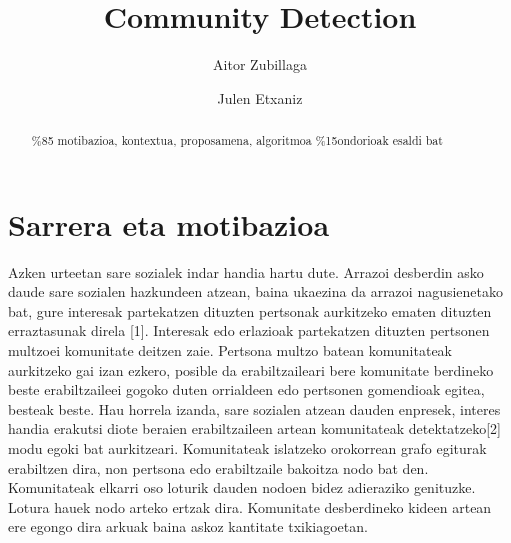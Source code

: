 \documentclass[sigconf]{acmart}
\begin{document}
\title{Community Detection}

\author{Aitor Zubillaga}

\author{Julen Etxaniz}



\begin{abstract}
\%85 motibazioa, kontextua, proposamena, algoritmoa
\%15ondorioak esaldi bat

\end{abstract}


\maketitle

\section{Sarrera eta motibazioa}

Azken urteetan sare sozialek indar handia hartu dute. Arrazoi desberdin asko daude sare sozialen hazkundeen atzean, baina ukaezina da arrazoi nagusienetako bat, gure interesak partekatzen dituzten pertsonak aurkitzeko ematen dituzten erraztasunak direla [1]. Interesak edo erlazioak partekatzen dituzten pertsonen multzoei komunitate deitzen zaie. Pertsona multzo batean komunitateak aurkitzeko gai izan ezkero, posible da erabiltzaileari bere komunitate berdineko beste erabiltzaileei gogoko duten orrialdeen edo pertsonen gomendioak egitea, besteak beste. Hau horrela izanda, sare sozialen atzean dauden enpresek, interes handia erakutsi diote beraien erabiltzaileen artean komunitateak detektatzeko[2] modu egoki bat aurkitzeari. Komunitateak islatzeko orokorrean grafo egiturak erabiltzen dira, non pertsona edo erabiltzaile bakoitza nodo bat den. Komunitateak elkarri oso loturik dauden nodoen bidez adieraziko genituzke. Lotura hauek nodo arteko ertzak dira. Komunitate desberdineko kideen artean ere egongo dira arkuak baina askoz kantitate txikiagoetan.
\end{document}
